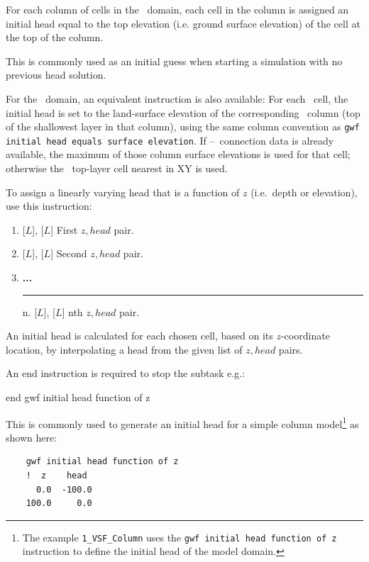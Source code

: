 {
     {For each column of cells in the \gwf\ domain, each cell in the column is assigned an initial head equal to the top elevation (i.e. ground surface elevation) of the cell at the top of the column.
    }

This is commonly used as an initial guess when starting a simulation with no previous head solution.

For the \cln\ domain, an equivalent instruction is also available:
    {For each \cln\ cell, the initial head is set to the land-surface elevation of the corresponding \gwf\ column (top of the shallowest layer in that column), using the same column convention as \texttt{gwf initial head equals surface elevation}. If \cln--\gwf\ connection data is already available, the maximum of those column surface elevations is used for that cell; otherwise the \gwf\ top-layer cell nearest in XY is used.}

To assign a linearly varying head that is a function of $z$ (i.e.\ depth or elevation), use this instruction:
    {
    \squish
    \begin{enumerate}
    \item {} [$L$],  [$L$]  First $z, head$ pair.
    \item {} [$L$],  [$L$]  Second $z, head$ pair.
    \item \textbf{...}\\
     \hspace*{-.27in}\rule{0.in}{.24in} n.  [$L$],   [$L$]  nth $z, head$  pair.
    \end{enumerate}

     An initial head is calculated for each chosen cell, based on its $z$-coordinate location, by interpolating a head from the given list of  $z, head$ pairs.

    An end instruction is required to stop the subtask e.g.:

    {\Large \sf end gwf initial head function of z}
    }

This is commonly used to generate an initial head for a simple column model\footnote{The example \texttt{1\_VSF\_Column} uses the \texttt{gwf initial head function of z} instruction to define the initial head of the model domain.} as shown here:
\begin{verbatim}
    gwf initial head function of z
    !  z    head
      0.0  -100.0
    100.0     0.0
\end{verbatim}

}
